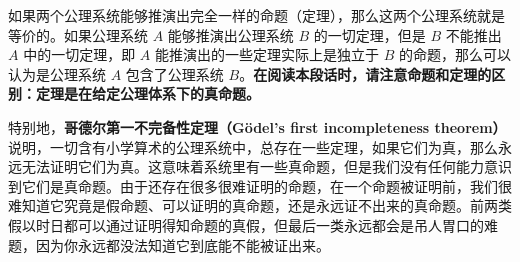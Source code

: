 如果两个公理系统能够推演出完全一样的命题（定理），那么这两个公理系统就是等价的。如果公理系统 $A$ 能够推演出公理系统 $B$ 的一切定理，但是 $B$ 不能推出 $A$ 中的一切定理，即 $A$ 能推演出的一些定理实际上是独立于 $B$ 的命题，那么可以认为是公理系统 $A$ 包含了公理系统 $B$。\textbf{在阅读本段话时，请注意命题和定理的区别：定理是在给定公理体系下的真命题。}

特别地，\textbf{哥德尔第一不完备性定理（Gödel's first incompleteness theorem）}说明，一切含有小学算术的公理系统中，总存在一些定理，如果它们为真，那么永远无法证明它们为真。这意味着系统里有一些真命题，但是我们没有任何能力意识到它们是真命题。由于还存在很多很难证明的命题，在一个命题被证明前，我们很难知道它究竟是假命题、可以证明的真命题，还是永远证不出来的真命题。前两类假以时日都可以通过证明得知命题的真假，但最后一类永远都会是吊人胃口的难题，因为你永远都没法知道它到底能不能被证出来。
